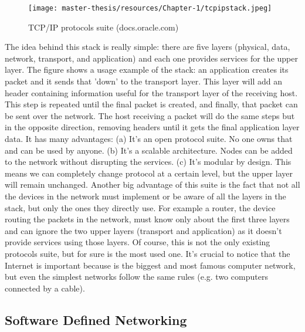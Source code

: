 \documentclass[a4paper,10pt]{memoir}
\begin{document}
\begin{wrapfigure}[17]{r}{0.55\textwidth}
\caption{TCP/IP protocols suite (docs.oracle.com)}
\label{fig:tcpipstack}
\texttt{[image: master-thesis/resources/Chapter-1/tcpipstack.jpeg]}
\end{wrapfigure}

The idea behind this stack is really simple: there are five layers (physical, data, network, transport, and application) and each one provides services for the upper layer. The figure shows a usage example of the stack: an application creates its packet and it sends that 'down' to the transport layer. This layer will add an header containing information useful for the transport layer of the receiving host. This step is repeated until the final packet is created, and finally, that packet can be sent over the network. The host receiving a packet will do the same steps but in the opposite direction, removing headers until it gets the final application layer data. It has many advantages: (a) It's an open protocol suite. No one owns that and can be used by anyone. (b) It's a scalable architecture. Nodes can be added to the network without disrupting the services. (c) It's modular by design. This means we can completely change protocol at a certain level, but the upper layer will remain unchanged. Another big advantage of this suite is the fact that not all the devices in the network must implement or be aware of all the layers in the stack, but only the ones they directly use. For example a router, the device routing the packets in the network, must know only about the first three layers and can ignore the two upper layers (transport and application) as it doesn't provide services using those layers. Of course, this is not the only existing protocols suite, but for sure is the most used one. It's crucial to notice that the Internet is important because is the biggest and most famous computer network, but even the simplest networks follow the same rules (e.g. two computers connected by a cable).

\subsection{Software Defined Networking}
\end{document}
